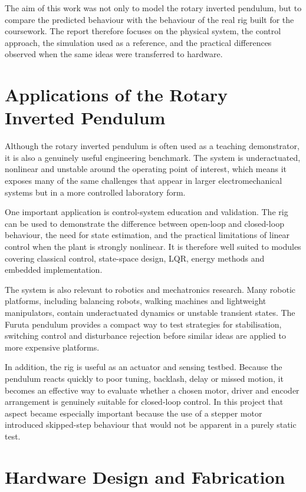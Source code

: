 \documentclass[conference]{IEEEtran}
\begin{document}
The aim of this work was not only to model the rotary inverted pendulum, but to compare the predicted behaviour with the behaviour of the real rig built for the coursework. The report therefore focuses on the physical system, the control approach, the simulation used as a reference, and the practical differences observed when the same ideas were transferred to hardware.

\section{Applications of the Rotary Inverted Pendulum}
Although the rotary inverted pendulum is often used as a teaching demonstrator, it is also a genuinely useful engineering benchmark. The system is underactuated, nonlinear and unstable around the operating point of interest, which means it exposes many of the same challenges that appear in larger electromechanical systems but in a more controlled laboratory form.

One important application is control-system education and validation. The rig can be used to demonstrate the difference between open-loop and closed-loop behaviour, the need for state estimation, and the practical limitations of linear control when the plant is strongly nonlinear. It is therefore well suited to modules covering classical control, state-space design, LQR, energy methods and embedded implementation.

The system is also relevant to robotics and mechatronics research. Many robotic platforms, including balancing robots, walking machines and lightweight manipulators, contain underactuated dynamics or unstable transient states. The Furuta pendulum provides a compact way to test strategies for stabilisation, switching control and disturbance rejection before similar ideas are applied to more expensive platforms.

In addition, the rig is useful as an actuator and sensing testbed. Because the pendulum reacts quickly to poor tuning, backlash, delay or missed motion, it becomes an effective way to evaluate whether a chosen motor, driver and encoder arrangement is genuinely suitable for closed-loop control. In this project that aspect became especially important because the use of a stepper motor introduced skipped-step behaviour that would not be apparent in a purely static test.

\section{Hardware Design and Fabrication}
\end{document}
